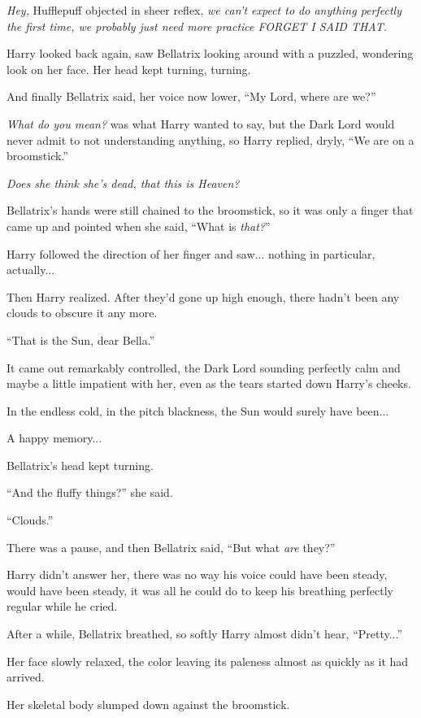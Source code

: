 \emph{Hey,} Hufflepuff objected in sheer reflex, \emph{we can't expect to do anything perfectly the first time, we probably just need more practice FORGET I SAID THAT.}

Harry looked back again, saw Bellatrix looking around with a puzzled, wondering look on her face. Her head kept turning, turning.

And finally Bellatrix said, her voice now lower, ``My Lord, where are we?''

\emph{What do you mean?} was what Harry wanted to say, but the Dark Lord would never admit to not understanding anything, so Harry replied, dryly, ``We are on a broomstick.''

\emph{Does she think she's dead, that this is Heaven?}

Bellatrix's hands were still chained to the broomstick, so it was only a finger that came up and pointed when she said, ``What is \emph{that?}''

Harry followed the direction of her finger and saw... nothing in particular, actually...

Then Harry realized. After they'd gone up high enough, there hadn't been any clouds to obscure it any more.

``That is the Sun, dear Bella.''

It came out remarkably controlled, the Dark Lord sounding perfectly calm and maybe a little impatient with her, even as the tears started down Harry's cheeks.

In the endless cold, in the pitch blackness, the Sun would surely have been...

A happy memory...

Bellatrix's head kept turning.

``And the fluffy things?'' she said.

``Clouds.''

There was a pause, and then Bellatrix said, ``But what \emph{are} they?''

Harry didn't answer her, there was no way his voice could have been steady, would have been steady, it was all he could do to keep his breathing perfectly regular while he cried.

After a while, Bellatrix breathed, so softly Harry almost didn't hear, ``Pretty...''

Her face slowly relaxed, the color leaving its paleness almost as quickly as it had arrived.

Her skeletal body slumped down against the broomstick.

